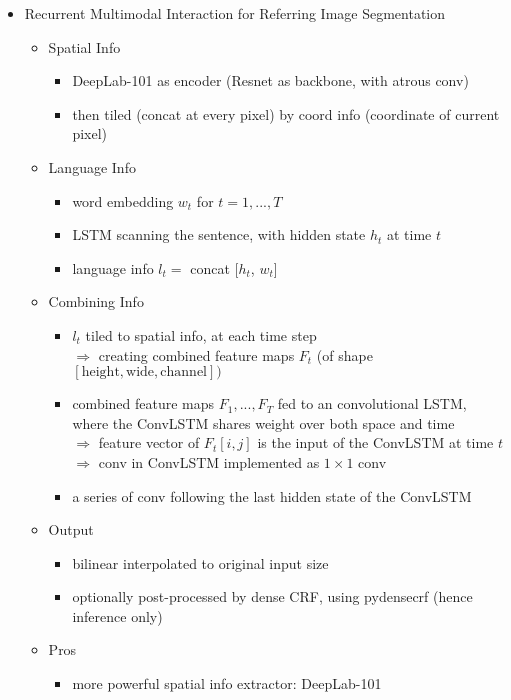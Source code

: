 \begin{itemize}
\item Recurrent Multimodal Interaction for Referring Image Segmentation
	\begin{itemize}
	\item Spatial Info
		\begin{itemize}
		\item DeepLab-101 as encoder (Resnet as backbone, with atrous conv)
		\item then tiled (concat at every pixel) by coord info (coordinate of current pixel)
		\end{itemize}
	\item Language Info
		\begin{itemize}
		\item word embedding $w_t$ for $t=1,...,T$
		\item LSTM scanning the sentence, with hidden state $h_t$ at time $t$
		\item language info $l_t=$ concat [$h_t$, $w_t$]
		\end{itemize}
	\item Combining Info
		\begin{itemize}
		\item $l_t$ tiled to spatial info, at each time step \\
		$\Rightarrow$ creating combined feature maps $F_t$ (of shape $[\text{height}, \text{wide}, \text{channel}])$
		\item combined feature maps $F_1,...,F_T$ fed to an convolutional LSTM, \\
		where the ConvLSTM shares weight over both space and time \\
		$\Rightarrow$ feature vector of $F_t[i,j]$ is the input of the ConvLSTM at time $t$ \\
		$\Rightarrow$ conv in ConvLSTM implemented as $1\times1$ conv
		\item a series of conv following the last hidden state of the ConvLSTM
		\end{itemize}
	\item Output
		\begin{itemize}
		\item bilinear interpolated to original input size
		\item optionally post-processed by dense CRF, using pydensecrf (hence inference only)
		\end{itemize}
	\item Pros
		\begin{itemize}
		\item more powerful spatial info extractor: DeepLab-101

\end{itemize}
\end{itemize}
\end{itemize}
